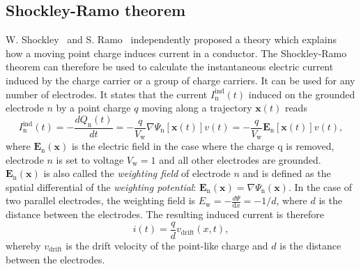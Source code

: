 \subsection{Shockley-Ramo theorem}
W. Shockley~\cite{SHOCKLEY:00000} and S. Ramo~\cite{RAMO:00000} independently proposed a theory which explains how a moving point charge induces current in a conductor. The Shockley-Ramo theorem can therefore be used to calculate the instantaneous electric current induced by the charge carrier or a group of charge carriers. It can be used for any number of electrodes. It states that the current $I_\mathrm{n}^{\mathrm{ind}}(t)$ induced on the grounded electrode $n$ by a point charge $q$ moving along a trajectory $\textbf{x}(t)$ reads
\begin{equation}
\label{eq:ramo}
I_\mathrm{n}^{\mathrm{ind}}(t) = -\frac{dQ_\mathrm{n}(t)}{dt} =  -\frac{q}{V_\mathrm{w}}\nabla\Psi_\mathrm{n}[\textbf{x}(t)]v(t)  =  -\frac{q}{V_\mathrm{w}}\textbf{E}_\mathrm{n}[\textbf{x}(t)]v(t),
\end{equation}
where $\textbf{E}_\mathrm{n}(\textbf{x})$ is the electric field in the case where the charge q is removed, electrode $n$ is  set to voltage $V_\mathrm{w}=1$ and all other electrodes are grounded. $\textbf{E}_\mathrm{n}(\textbf{x})$ is also called the \emph{weighting field} of electrode $n$ and is defined as the spatial differential of the \emph{weighting potential}: $\textbf{E}_\mathrm{n}(\textbf{x})=\nabla \Psi_\mathrm{n}(\textbf{x})$. In the case of two parallel electrodes, the weighting field is $E_\mathrm{w} = -\frac{d\Psi}{\mathrm{d}x} = -1/d$, where $d$ is the distance between the electrodes. The resulting induced current is therefore
\begin{equation}
\label{eq:ramoparallel}
i(t) = \frac{q}{d}v_\mathrm{drift}(x,t),
\end{equation} 
whereby $v_{\mathrm{drift}}$ is the drift velocity of the point-like charge and $d$ is the distance between the electrodes.








